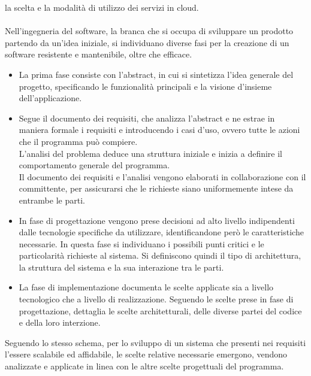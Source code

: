 la scelta e la modalità di utilizzo dei servizi in cloud.\\
\\
Nell'ingegneria del software, la branca che si occupa di sviluppare un prodotto partendo da un'idea iniziale, 
si individuano diverse fasi per la creazione di un software resistente e mantenibile, oltre che efficace.\\
\begin{itemize}
    \item La prima fase consiste con l'abstract, in cui si sintetizza l'idea generale del progetto, 
    specificando le funzionalità principali e la visione d'insieme dell'applicazione.
    \item Segue il documento dei requisiti, che analizza l'abstract e ne estrae in maniera formale i requisiti e introducendo i casi d'uso, 
    ovvero tutte le azioni che il programma può compiere.\\
    L'analisi del problema deduce una struttura iniziale e inizia a definire il comportamento generale del programma.\\
    Il documento dei requisiti e l'analisi vengono elaborati in collaborazione con il committente, 
    per assicurarsi che le richieste siano uniformemente intese da entrambe le parti.
    \item In fase di progettazione vengono prese decisioni ad alto livello indipendenti dalle tecnologie specifiche da utilizzare, 
    identificandone però le caratteristiche necessarie. 
    In questa fase si individuano i possibili punti critici e le particolarità richieste al sistema.
    Si definiscono quindi il tipo di architettura, la struttura del sistema e la sua interazione tra le parti.
    \item La fase di implementazione documenta le scelte applicate sia a livello tecnologico che a livello di realizzazione. 
    Seguendo le scelte prese in fase di progettazione, dettaglia le scelte architetturali, delle diverse partei del codice e della loro interzione.
\end{itemize}
Seguendo lo stesso schema, per lo sviluppo di un sistema che presenti nei requisiti l'essere scalabile ed affidabile, 
le scelte relative necessarie emergono, vendono analizzate e applicate in linea con le altre scelte progettuali del programma.\\
\clearpage











